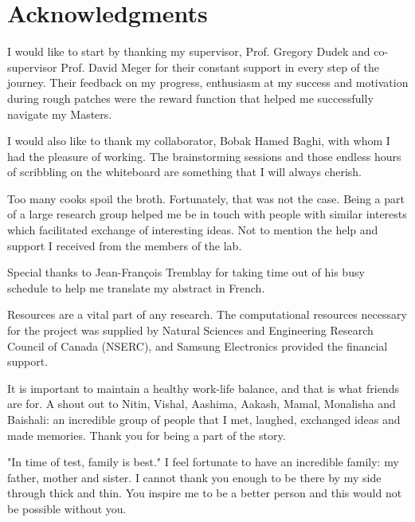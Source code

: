 \chapter*{\rm\bfseries Acknowledgments}

I would like to start by thanking my supervisor, Prof. Gregory Dudek and co-supervisor Prof. David Meger for their constant support in every step of the journey. Their feedback on my progress, enthusiasm at my success and motivation during rough patches were the reward function that helped me successfully navigate my Masters. %

I would also like to thank my collaborator, Bobak Hamed Baghi, with whom I had the pleasure of working. The brainstorming sessions and those endless hours of scribbling on the whiteboard are something that I will always cherish.  


Too many cooks spoil the broth. Fortunately, that was not the case. Being a part of a large research group helped me be in touch with people with similar interests which facilitated exchange of interesting ideas. Not to mention the help and support I received from the members of the lab. %

Special thanks to Jean-Fran\c cois Tremblay for taking time out of his busy schedule to help me translate my abstract in French.


Resources are a vital part of any research. The computational resources necessary for the project was supplied by Natural Sciences and Engineering Research Council of Canada (NSERC), and Samsung Electronics provided the financial support.


It is important to maintain a healthy work-life balance, and that is what friends are for. A shout out to Nitin, Vishal, Aashima, Aakash, Mamal, Monalisha and Baishali: an incredible group of people that I met, laughed, exchanged ideas and made memories. Thank you for being a part of the story.

"In time of test, family is best." I feel fortunate to have an incredible family: my father, mother and sister. I cannot thank you enough to be there by my side through thick and thin. You inspire me to be a better person and this would not be possible without you.


